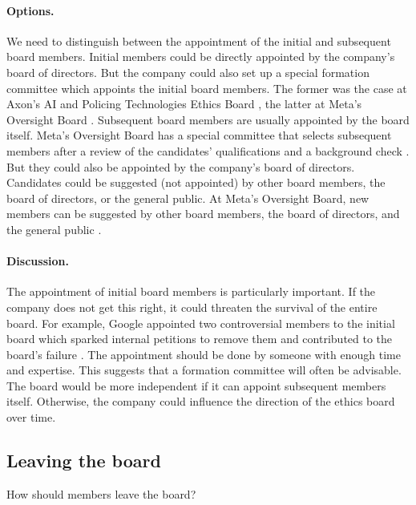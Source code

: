 \documentclass{article}
\begin{document}
\paragraph{Options.} We need to distinguish between the appointment of the initial and subsequent board members. Initial members could be directly appointed by the company’s board of directors. But the company could also set up a special formation committee which appoints the initial board members. The former was the case at Axon’s AI and Policing Technologies Ethics Board \cite{axon2019policing}, the latter at Meta’s Oversight Board \cite{oversight2023charter}. Subsequent board members are usually appointed by the board itself. Meta’s Oversight Board has a special committee that selects subsequent members after a review of the candidates’ qualifications and a background check \cite{oversight2023charter}. But they could also be appointed by the company’s board of directors. Candidates could be suggested (not appointed) by other board members, the board of directors, or the general public. At Meta’s Oversight Board, new members can be suggested by other board members, the board of directors, and the general public \cite{oversight2023charter}.

\paragraph{Discussion.} The appointment of initial board members is particularly important. If the company does not get this right, it could threaten the survival of the entire board. For example, Google appointed two controversial members to the initial board which sparked internal petitions to remove them and contributed to the board’s failure \cite{piper2019googlefail}. The appointment should be done by someone with enough time and expertise. This suggests that a formation committee will often be advisable. The board would be more independent if it can appoint subsequent members itself. Otherwise, the company could influence the direction of the ethics board over time.

\subsection{Leaving the board}\label{Ch:4:2:leaving}

How should members leave the board?
\end{document}
